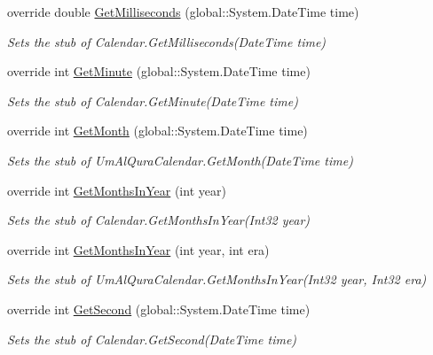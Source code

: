 \begin{DoxyCompactItemize}
override double \hyperlink{class_system_1_1_globalization_1_1_fakes_1_1_stub_um_al_qura_calendar_ae0b29eebf92a2e1811fb3613c56c8ba5}{Get\-Milliseconds} (global\-::\-System.\-Date\-Time time)
\begin{DoxyCompactList}\small\item\em Sets the stub of Calendar.\-Get\-Milliseconds(\-Date\-Time time)\end{DoxyCompactList}\item 
override int \hyperlink{class_system_1_1_globalization_1_1_fakes_1_1_stub_um_al_qura_calendar_af42788dcaa3ffeac02b0e432eed5a7af}{Get\-Minute} (global\-::\-System.\-Date\-Time time)
\begin{DoxyCompactList}\small\item\em Sets the stub of Calendar.\-Get\-Minute(\-Date\-Time time)\end{DoxyCompactList}\item 
override int \hyperlink{class_system_1_1_globalization_1_1_fakes_1_1_stub_um_al_qura_calendar_a200146f9e33e9612f82548fda1b1c455}{Get\-Month} (global\-::\-System.\-Date\-Time time)
\begin{DoxyCompactList}\small\item\em Sets the stub of Um\-Al\-Qura\-Calendar.\-Get\-Month(\-Date\-Time time)\end{DoxyCompactList}\item 
override int \hyperlink{class_system_1_1_globalization_1_1_fakes_1_1_stub_um_al_qura_calendar_afca217f7198844842ac161f86d2b3828}{Get\-Months\-In\-Year} (int year)
\begin{DoxyCompactList}\small\item\em Sets the stub of Calendar.\-Get\-Months\-In\-Year(\-Int32 year)\end{DoxyCompactList}\item 
override int \hyperlink{class_system_1_1_globalization_1_1_fakes_1_1_stub_um_al_qura_calendar_a9a23fd09069db15b59e50644cb2d57f0}{Get\-Months\-In\-Year} (int year, int era)
\begin{DoxyCompactList}\small\item\em Sets the stub of Um\-Al\-Qura\-Calendar.\-Get\-Months\-In\-Year(\-Int32 year, Int32 era)\end{DoxyCompactList}\item 
override int \hyperlink{class_system_1_1_globalization_1_1_fakes_1_1_stub_um_al_qura_calendar_a3645738f46ec2904b0e6635bec13040c}{Get\-Second} (global\-::\-System.\-Date\-Time time)
\begin{DoxyCompactList}\small\item\em Sets the stub of Calendar.\-Get\-Second(\-Date\-Time time)\end{DoxyCompactList}\item 

\end{DoxyCompactItemize}
